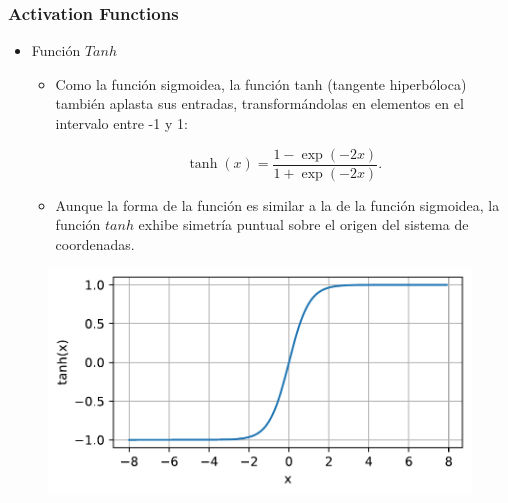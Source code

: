 \documentclass[
  shownotes,
  xcolor={svgnames},
  hyperref={colorlinks,citecolor=DarkBlue,linkcolor=DarkRed,urlcolor=DarkBlue}
  , aspectratio=169]{beamer}
\begin{document}
\begin{frame}
\frametitle{Activation Functions}




\begin{itemize}
    
\item Función $Tanh$ 
  \begin{itemize}
        \item Como la función sigmoidea, la función tanh (tangente hiperbóloca) también aplasta sus entradas, transformándolas en elementos en el intervalo entre -1 y 1:

        $$\operatorname{tanh}(x) = \frac{1 - \exp(-2x)}{1 + \exp(-2x)}.$$

        \item Aunque la forma de la función es similar a la de la función sigmoidea, la función $tanh$ exhibe simetría puntual sobre el origen del sistema de coordenadas.
    \end{itemize}
\end{itemize}

  \begin{figure}[H] \centering
            \captionsetup{justification=centering}
              \includegraphics[scale=0.45]{figures/tanh}
              
 \end{figure}

\end{frame}
\end{document}
